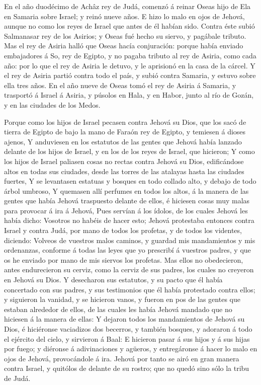  En el año duodécimo de Achâz rey de Judá, comenzó á reinar
Oseas hijo de Ela en Samaria sobre Israel; y reinó nueve años.
 E hizo lo malo en ojos de Jehová, aunque no como los reyes
de Israel que antes de él habían sido.  Contra éste subió
Salmanasar rey de los Asirios; y Oseas fué hecho su siervo, y pagábale
tributo.  Mas el rey de Asiria halló que Oseas hacía
conjuración: porque había enviado embajadores á So, rey de Egipto, y no
pagaba tributo al rey de Asiria, como cada año: por lo que el rey de
Asiria le detuvo, y le aprisionó en la casa de la cárcel.  Y
el rey de Asiria partió contra todo el país, y subió contra Samaria, y
estuvo sobre ella tres años.  En el año nueve de Oseas tomó
el rey de Asiria á Samaria, y trasportó á Israel á Asiria, y púsolos en
Hala, y en Habor, junto al río de Gozán, y en las ciudades de los Medos.

 Porque como los hijos de Israel pecasen contra Jehová su
Dios, que los sacó de tierra de Egipto de bajo la mano de Faraón rey de
Egipto, y temiesen á dioses ajenos,  Y anduviesen en los
estatutos de las gentes que Jehová había lanzado delante de los hijos de
Israel, y en los de los reyes de Israel, que hicieron;  Y
como los hijos de Israel paliasen cosas no rectas contra Jehová su Dios,
edificándose altos en todas sus ciudades, desde las torres de las
atalayas hasta las ciudades fuertes,  Y se levantasen
estatuas y bosques en todo collado alto, y debajo de todo árbol umbroso,
 Y quemasen allí perfumes en todos los altos, á la manera
de las gentes que había Jehová traspuesto delante de ellos, é hiciesen
cosas muy malas para provocar á ira á Jehová,  Pues servían
á los ídolos, de los cuales Jehová les había dicho: Vosotros no habéis
de hacer esto;  Jehová protestaba entonces contra Israel y
contra Judá, por mano de todos los profetas, y de todos los videntes,
diciendo: Volveos de vuestros malos caminos, y guardad mis mandamientos
y mis ordenanzas, conforme á todas las leyes que yo prescribí á vuestros
padres, y que os he enviado por mano de mis siervos los profetas.
 Mas ellos no obedecieron, antes endurecieron su cerviz,
como la cerviz de sus padres, los cuales no creyeron en Jehová su Dios.
 Y desecharon sus estatutos, y su pacto que él había
concertado con sus padres, y sus testimonios que él había protestado
contra ellos; y siguieron la vanidad, y se hicieron vanos, y fueron en
pos de las gentes que estaban alrededor de ellos, de las cuales les
había Jehová mandado que no hiciesen á la manera de ellas: 
Y dejaron todos los mandamientos de Jehová su Dios, é hiciéronse
vaciadizos dos becerros, y también bosques, y adoraron á todo el
ejército del cielo, y sirvieron á Baal:  E hicieron pasar á
sus hijos y á sus hijas por fuego; y diéronse á adivinaciones y agüeros,
y entregáronse á hacer lo malo en ojos de Jehová, provocándole á ira.
 Jehová por tanto se airó en gran manera contra Israel, y
quitólos de delante de su rostro; que no quedó sino sólo la tribu de
Judá.

